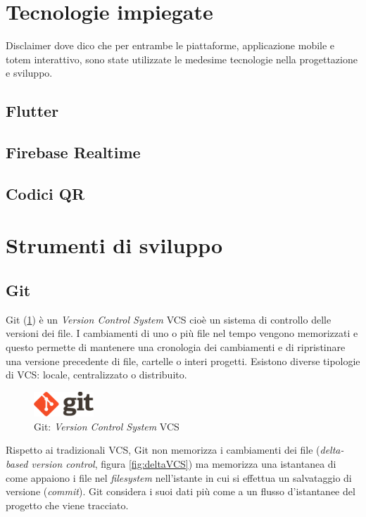 %
%
%
\section{Tecnologie impiegate}
Disclaimer dove dico che per entrambe le piattaforme, applicazione mobile e totem interattivo, sono state utilizzate le medesime tecnologie nella progettazione e sviluppo.
%
\subsection{Flutter}
%
\subsection{Firebase Realtime}
%
\subsection{Codici QR}
%
\section{Strumenti di sviluppo}
\subsection{Git}
Git (\ref{fig:gitLogo}) è un \textit{Version Control System} VCS cioè un sistema di controllo delle versioni dei file. I cambiamenti di uno o più file nel tempo vengono memorizzati e questo permette di mantenere una cronologia dei cambiamenti e di ripristinare una versione precedente di file, cartelle o interi progetti.
Esistono diverse tipologie di VCS: locale, centralizzato o distribuito.
\begin{figure}
    \centering
    \includegraphics[width=0.2\textwidth]{img/gitlogo.png}
    \caption[short]{Git: \textit{Version Control System} VCS}
    \label{fig:gitLogo}
\end{figure}
Rispetto ai tradizionali VCS, Git non memorizza i cambiamenti dei file (\textit{delta-based version control}, figura \ref{fig:deltaVCS}) ma memorizza una istantanea di come appaiono i file nel \textit{filesystem} nell'istante in cui si effettua un salvataggio di versione (\textit{commit}). Git considera i suoi dati più come a un flusso d'istantanee del progetto che viene tracciato.

